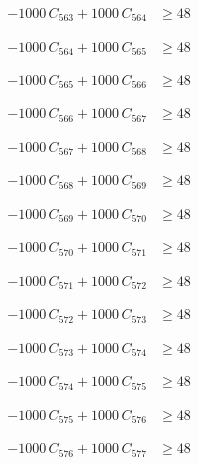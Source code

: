 \documentclass[a4paper,11pt]{article}
\begin{document}
\begin{align}
-1000\,C_{563} + 1000\,C_{564} &\geq 48 \nonumber
\end{align}

\begin{align}
-1000\,C_{564} + 1000\,C_{565} &\geq 48 \nonumber
\end{align}

\begin{align}
-1000\,C_{565} + 1000\,C_{566} &\geq 48 \nonumber
\end{align}

\begin{align}
-1000\,C_{566} + 1000\,C_{567} &\geq 48 \nonumber
\end{align}

\begin{align}
-1000\,C_{567} + 1000\,C_{568} &\geq 48 \nonumber
\end{align}

\begin{align}
-1000\,C_{568} + 1000\,C_{569} &\geq 48 \nonumber
\end{align}

\begin{align}
-1000\,C_{569} + 1000\,C_{570} &\geq 48 \nonumber
\end{align}

\begin{align}
-1000\,C_{570} + 1000\,C_{571} &\geq 48 \nonumber
\end{align}

\begin{align}
-1000\,C_{571} + 1000\,C_{572} &\geq 48 \nonumber
\end{align}

\begin{align}
-1000\,C_{572} + 1000\,C_{573} &\geq 48 \nonumber
\end{align}

\begin{align}
-1000\,C_{573} + 1000\,C_{574} &\geq 48 \nonumber
\end{align}

\begin{align}
-1000\,C_{574} + 1000\,C_{575} &\geq 48 \nonumber
\end{align}

\begin{align}
-1000\,C_{575} + 1000\,C_{576} &\geq 48 \nonumber
\end{align}

\begin{align}
-1000\,C_{576} + 1000\,C_{577} &\geq 48 \nonumber
\end{align}
\end{document}
